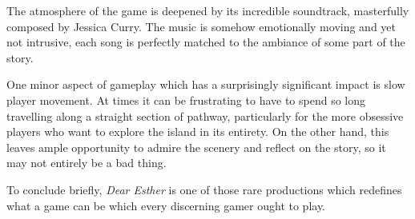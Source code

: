 \documentclass[a4paper,12pt]{article}
\begin{document}
The atmosphere of the game is deepened by its incredible soundtrack, masterfully composed by Jessica Curry.  The music is somehow emotionally moving and yet not intrusive, each song is perfectly matched to the ambiance of some part of the story.

One minor aspect of gameplay which has a surprisingly significant impact is slow player movement.  At times it can be frustrating to have to spend so long travelling along a straight section of pathway, particularly for the more obsessive players who want to explore the island in its entirety.  On the other hand, this leaves ample opportunity to admire the scenery and reflect on the story, so it may not entirely be a bad thing.

To conclude briefly, \emph{Dear Esther} is one of those rare productions which redefines what a game can be which every discerning gamer ought to play.
\end{document}
